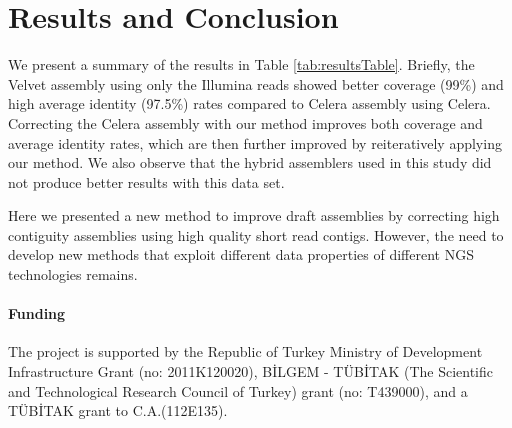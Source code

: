 \documentclass[12pt]{article}
\begin{document}
\section{Results and Conclusion}
\label{res}
We present a summary of the results in Table \ref{tab:resultsTable}. Briefly, the Velvet assembly using only the Illumina reads showed better coverage (99\%) and high average identity  (97.5\%) rates compared to Celera assembly using Celera. Correcting the Celera assembly with our method improves both coverage and average identity rates, which are then further improved by reiteratively applying our method. We also observe that the hybrid assemblers used in this study did not produce better results with this data set.


 Here we presented a new method to improve draft assemblies by correcting high contiguity assemblies using high quality short read contigs. However, the need to develop new methods that exploit
 different data properties of different NGS technologies remains.
       
\paragraph{Funding\textcolon}
\footnotesize
The project is supported by the Republic of Turkey Ministry of Development Infrastructure Grant (no: 2011K120020), B\.{I}LGEM \-- T\"{U}B\.{I}TAK (The Scientific and Technological Research Council of Turkey) grant (no: T439000), and a T\"{U}B\.{I}TAK grant to C.A.(112E135).\\
\end{document}
